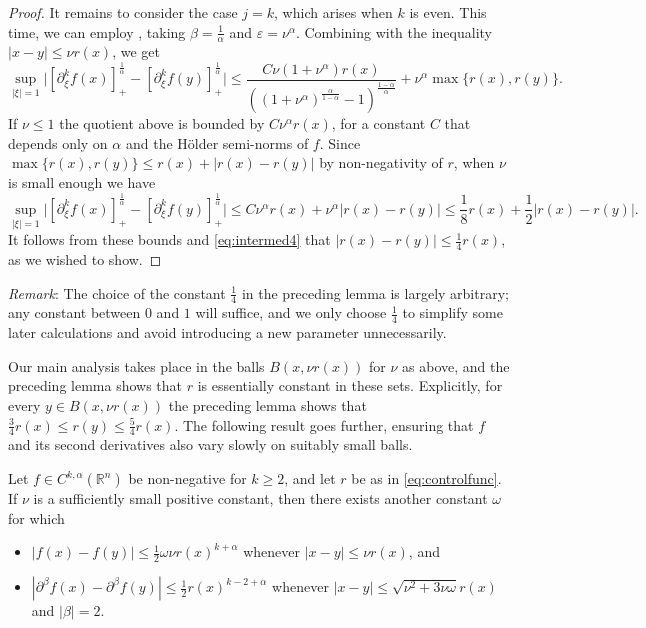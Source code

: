 \documentclass[oneside,hidelinks,indentfirst,10pt]{book}
\begin{document}
\begin{proof}
It remains to consider the case \(j=k\), which arises when \(k\) is even. This time, we can employ , taking \(\beta=\frac{1}{\alpha}\) and \(\varepsilon=\nu^\alpha\). Combining with the inequality \(|x-y|\leq \nu r(x)\), we get
\[
    \sup_{|\xi|=1}\big|[\partial^k_\xi f(x)]_+^\frac{1}{\alpha}-[\partial^k_\xi f(y)]_+^\frac{1}{\alpha}\big|\leq\frac{C\nu (1+\nu^\alpha)r(x)}{((1+\nu^\alpha)^{\frac{\alpha}{1-\alpha}}-1)^\frac{1-\alpha}{\alpha}}+\nu^\alpha\max\{r(x),r(y)\}.
\]
If \(\nu\leq 1\) the quotient above is bounded by \(C\nu^\alpha r(x)\), for a constant \(C\) that depends only on \(\alpha\) and the H\"older semi-norms of \(f\). Since \(\max\{r(x),r(y)\}\leq r(x)+|r(x)-r(y)|\) by non-negativity of \(r\), when \(\nu\) is small enough we  have
\[
    \sup_{|\xi|=1}\big|[\partial^k_\xi f(x)]_+^\frac{1}{\alpha}-[\partial^k_\xi f(y)]_+^\frac{1}{\alpha}\big|\leq C\nu^\alpha r(x)+\nu^\alpha|r(x)-r(y)|\leq \frac{1}{8}r(x)+\frac{1}{2}|r(x)-r(y)|.
\]
It follows from these bounds and \eqref{eq:intermed4} that \(|r(x)-r(y)|\leq \frac{1}{4}r(x)\), as we wished to show.
\end{proof}


\textit{Remark}: The choice of the constant \(\frac{1}{4}\) in the preceding lemma is largely arbitrary; any constant between \(0\) and \(1\) will suffice, and we only choose \(\frac{1}{4}\) to simplify some later calculations and avoid introducing a new parameter unnecessarily.


Our main analysis takes place in the balls \(B(x,\nu r(x))\) for \(\nu\) as above, and the preceding lemma shows that \(r\) is essentially constant in these sets. Explicitly, for every \(y\in B(x,\nu r(x))\) the preceding lemma shows that \(\frac{3}{4}r(x)\leq r(y)\leq \frac{5}{4}r(x)\). The following result goes further, ensuring that \(f\) and its second derivatives also vary slowly on suitably small balls.


\begin{cor}\label{cor:supplementary}
Let \(f\in C^{k,\alpha}(\mathbb{R}^n)\) be non-negative for \(k\geq 2\), and let \(r\) be as in \eqref{eq:controlfunc}. If \(\nu\) is a sufficiently small positive constant, then there exists another constant \(\omega\) for which
\begin{itemize}
    \item[(1)] \(|f(x)-f(y)|\leq \frac{1}{2}\omega \nu r(x)^{k+\alpha}\) whenever \(|x-y|\leq \nu r(x)\), and
    \item[(2)] \(|\partial^\beta f(x)-\partial^\beta f(y)|\leq \frac{1}{2}r(x)^{k-2+\alpha}\) whenever \(|x-y|\leq \sqrt{\nu^2+3\nu\omega}r(x)\) and \(|\beta|=2\).
\end{itemize}
\end{cor}
\end{document}
